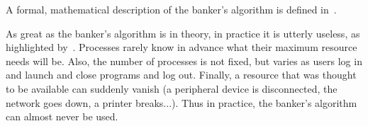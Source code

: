 A formal, mathematical description of the banker's algorithm is defined in~\cite{osc}.

As great as the banker's algorithm is in theory, in practice it is utterly useless, as highlighted by~\cite{mos}. Processes rarely know in advance what their maximum resource needs will be. Also, the number of processes is not fixed, but varies as users log in and launch and close programs and log out. Finally, a resource that was thought to be available can suddenly vanish (a peripheral device is disconnected, the network goes down, a printer breaks...). Thus in practice, the banker's algorithm can almost never be used.




